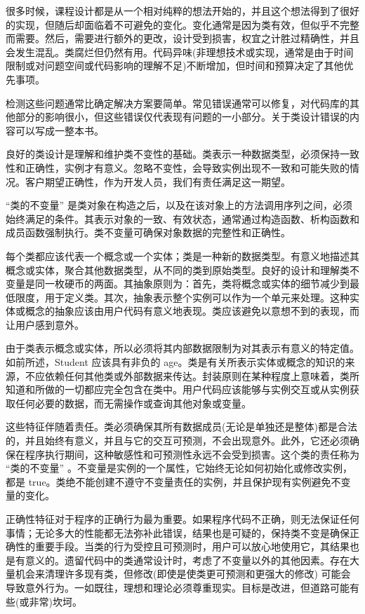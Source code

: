 
很多时候，课程设计都是从一个相对纯粹的想法开始的，并且这个想法得到了很好的实现，但随后却面临着不可避免的变化。变化通常是因为类有效，但似乎不完整而需要。然后，需要进行额外的更改，设计受到损害，权宜之计胜过精确性，并且会发生混乱。类腐烂但仍然有用。代码异味(非理想技术或实现，通常是由于时间限制或对问题空间或代码影响的理解不足)不断增加，但时间和预算决定了其他优先事项。

检测这些问题通常比确定解决方案要简单。常见错误通常可以修复，对代码库的其他部分的影响很小，但这些错误仅代表现有问题的一小部分。关于类设计错误的内容可以写成一整本书。

良好的类设计是理解和维护类不变性的基础。类表示一种数据类型，必须保持一致性和正确性，实例才有意义。忽略不变性，会导致实例出现不一致和可能失败的情况。客户期望正确性，作为开发人员，我们有责任满足这一期望。


“类的不变量” 是类对象在构造之后，以及在该对象上的方法调用序列之间，必须始终满足的条件。其表示对象的一致、有效状态，通常通过构造函数、析构函数和成员函数强制执行。类不变量可确保对象数据的完整性和正确性。

每个类都应该代表一个概念或一个实体；类是一种新的数据类型。有意义地描述其概念或实体，聚合其他数据类型，从不同的类到原始类型。良好的设计和理解类不变量是同一枚硬币的两面。其抽象原则为：首先，类将概念或实体的细节减少到最低限度，用于定义类。其次，抽象表示整个实例可以作为一个单元来处理。这种实体或概念的抽象应该由用户代码有意义地表现。类应该避免以意想不到的表现，而让用户感到意外。

由于类表示概念或实体，所以必须将其内部数据限制为对其表示有意义的特定值。如前所述，Student 应该具有非负的 age。类是有关所表示实体或概念的知识的来源，不应依赖任何其他类或外部数据来传达。封装原则在某种程度上意味着，类所知道和所做的一切都应完全包含在类中。用户代码应该能够与实例交互或从实例获取任何必要的数据，而无需操作或查询其他对象或变量。

这些特征伴随着责任。类必须确保其所有数据成员(无论是单独还是整体)都是合法的，并且始终有意义，并且与它的交互可预测，不会出现意外。此外，它还必须确保在程序执行期间，这种敏感性和可预测性永远不会受到损害。这个类的责任称为 “类的不变量” 。不变量是实例的一个属性，它始终无论如何初始化或修改实例，都是 true。类绝不能创建不遵守不变量责任的实例，并且保护现有实例避免不变量的变化。

正确性特征对于程序的正确行为最为重要。如果程序代码不正确，则无法保证任何事情；无论多大的性能都无法弥补此错误，结果也是可疑的，保持类不变是确保正确性的重要手段。当类的行为受控且可预测时，用户可以放心地使用它，其结果也是有意义的。遗留代码中的类通常设计时，考虑了不变量以外的其他因素。存在大量机会来清理许多现有类，但修改(即使是使类更可预测和更强大的修改) 可能会导致意外行为。一如既往，理想和理论必须尊重现实。目标是改进，但道路可能有些(或非常)坎坷。


